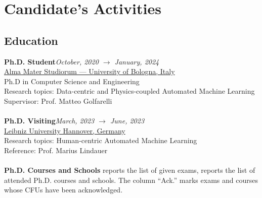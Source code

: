 \section*{Candidate's Activities}

\subsection*{Education}

\textbf{Ph.D. Student}\hfill \textit{October, 2020 $\rightarrow$ January, 2024}\\
\underline{Alma Mater Studiorum --- University of Bologna, Italy}\\
Ph.D in Computer Science and Engineering\\
Research topics: Data-centric and Physics-coupled Automated Machine Learning\\
Supervisor: Prof. Matteo Golfarelli\\
\\
\textbf{Ph.D. Visiting}\hfill \textit{March, 2023 $\rightarrow$ June, 2023}\\
\underline{Leibniz University Hannover, Germany}\\
Research topics: Human-centric Automated Machine Learning\\
Reference: Prof. Marius Lindauer\\
\\
\textbf{Ph.D. Courses and Schools}
 reports the list of given exams,  reports the list of attended Ph.D. courses and schools.
The column ``Ack.'' marks exams and courses whose CFUs  have been acknowledged.
\renewcommand{\arraystretch}{1.3}
